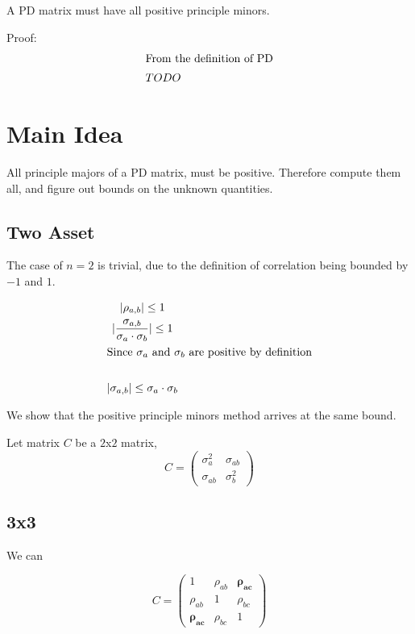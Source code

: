 \documentclass[a4paper]{article}
\begin{document}
\begin{theorem} \label{PD implies positive principle minors} 
A PD matrix must have all positive principle minors.

Proof:
\begin{gather*}
\shortintertext{From the definition of PD}
TODO
\end{gather*}
\end{theorem}

\section{Main Idea}
All principle majors of a PD matrix, must be positive. Therefore compute them all, and figure out bounds on the unknown quantities. 

\subsection{Two Asset}
The case of $n=2$ is trivial, due to the definition of correlation being bounded by $-1$ and $1$. 

\begin{gather*}
|\rho_{a,b}| \leq 1 \\
|\frac{\sigma_{a,b}}{\sigma_a \cdot \sigma_b}| \leq 1 \\
\shortintertext{Since $\sigma_a$ and $\sigma_b$ are positive by definition} \\
|\sigma_{a,b}| \leq \sigma_a \cdot \sigma_b
\end{gather*}

We show that the positive principle minors method arrives at the same bound. 

Let matrix $C$ be a $2$x$2$ matrix, 
\begin{equation}
C = \begin{pmatrix}
\sigma_a^2 & \sigma_{ab} \\
\sigma_{ab} & \sigma_b^2
\end{pmatrix}
\end{equation}

\subsection{3x3}
We can  

\begin{equation}
C = \begin{pmatrix}
1 & \rho_{ab} & \mathbf{\rho_{ac}} \\
\rho_{ab} & 1 & \rho_{bc} \\
\mathbf{\rho_{ac}} & \rho_{bc} & 1
\end{pmatrix}
\end{equation}
\end{document}
